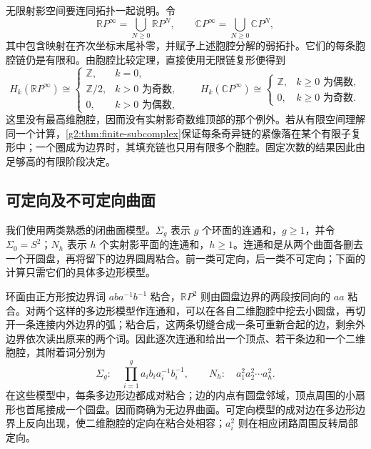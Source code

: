 无限射影空间要连同拓扑一起说明。令
\[
	\mathbb RP^\infty=\bigcup_{N\geq0}\mathbb RP^N,
	\qquad
	\mathbb CP^\infty=\bigcup_{N\geq0}\mathbb CP^N,
\]
其中包含映射在齐次坐标末尾补零，并赋予上述胞腔分解的弱拓扑。它们的每条胞腔链仍是有限和。由胞腔比较定理，直接使用无限链复形便得到
\[
	H_k(\mathbb RP^\infty)\cong
	\begin{cases}
		\mathbb Z,&k=0,\\
		\mathbb Z/2,&k>0\text{ 为奇数},\\
		0,&k>0\text{ 为偶数},
	\end{cases}
	\qquad
	H_k(\mathbb CP^\infty)\cong
	\begin{cases}
		\mathbb Z,&k\geq0\text{ 为偶数},\\
		0,&k\geq0\text{ 为奇数}.
	\end{cases}
\]
这里没有最高维胞腔，因而没有实射影奇数维顶部的那个例外。若从有限空间理解同一个计算，\cref{g2:thm:finite-subcomplex}保证每条奇异链的紧像落在某个有限子复形中；一个圈成为边界时，其填充链也只用有限多个胞腔。固定次数的结果因此由足够高的有限阶段决定。

\subsection{可定向及不可定向曲面}
\label{g2:subsec:0303:02}

我们使用两类熟悉的闭曲面模型。\(\Sigma_g\) 表示 \(g\) 个环面的连通和，\(g\geq1\)，并令 \(\Sigma_0=S^2\)；\(N_h\) 表示 \(h\) 个实射影平面的连通和，\(h\geq1\)。连通和是从两个曲面各删去一个开圆盘，再将留下的边界圆周粘合。前一类可定向，后一类不可定向；下面的计算只需它们的具体多边形模型。

\ProseParagraphBreak

环面由正方形按边界词 \(aba^{-1}b^{-1}\) 粘合，\(\mathbb RP^2\) 则由圆盘边界的两段按同向的 \(aa\) 粘合。对两个这样的多边形模型作连通和，可以在各自二维胞腔中挖去小圆盘，再切开一条连接内外边界的弧；粘合后，这两条切缝合成一条可重新合起的边，剩余外边界依次读出原来的两个词。因此逐次连通和给出一个顶点、若干条边和一个二维胞腔，其附着词分别为
\begin{equation}\label{g2:eq:surface-attaching-words}
	\Sigma_g:\quad\prod_{i=1}^g a_i b_i a_i^{-1}b_i^{-1},
	\qquad
	N_h:\quad a_1^2a_2^2\cdots a_h^2.
\end{equation}
在这些模型中，每条多边形边都成对粘合；边的内点有圆盘邻域，顶点周围的小扇形也首尾接成一个圆盘。因而商确为无边界曲面。可定向模型的成对边在多边形边界上反向出现，使二维胞腔的定向在粘合处相容；\(a_i^2\) 则在相应闭路周围反转局部定向。

